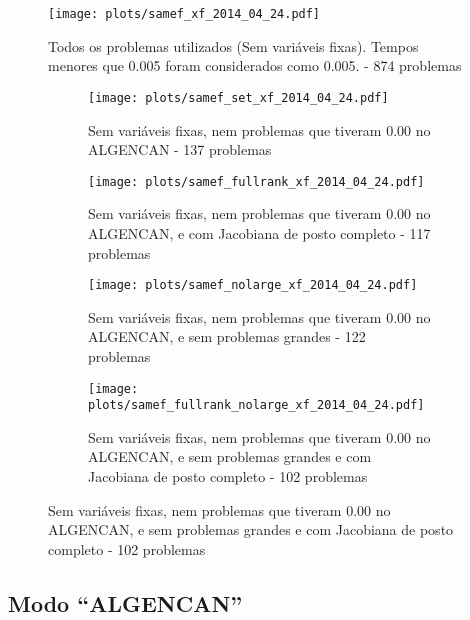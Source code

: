 \documentclass{article}
\begin{document}
\begin{figure}[H]
  \centering
  \texttt{[image: plots/samef\_xf\_2014\_04\_24.pdf]}
  \caption{Todos os problemas utilizados (Sem variáveis fixas). Tempos menores
    que 0.005 foram considerados como 0.005. - 874 problemas}
\end{figure}
\begin{figure}[H]
  \centering
  \begin{subfigure}{0.48\textwidth}
    \texttt{[image: plots/samef\_set\_xf\_2014\_04\_24.pdf]}
    \caption{Sem variáveis fixas, nem problemas
      que tiveram 0.00 no ALGENCAN - 137 problemas}
  \end{subfigure}
  \begin{subfigure}{0.48\textwidth}
    \texttt{[image: plots/samef\_fullrank\_xf\_2014\_04\_24.pdf]}
    \caption{Sem variáveis fixas, nem problemas
      que tiveram 0.00 no ALGENCAN, e com Jacobiana de posto completo - 117
      problemas}
  \end{subfigure}
  \begin{subfigure}{0.48\textwidth}
    \texttt{[image: plots/samef\_nolarge\_xf\_2014\_04\_24.pdf]}
    \caption{Sem variáveis fixas, nem problemas
      que tiveram 0.00 no ALGENCAN, e sem problemas grandes - 122 problemas}
  \end{subfigure}
  \begin{subfigure}{0.48\textwidth}
    \texttt{[image: plots/samef\_fullrank\_nolarge\_xf\_2014\_04\_24.pdf]}
    \caption{Sem variáveis fixas, nem problemas
      que tiveram 0.00 no ALGENCAN, e sem problemas grandes e com Jacobiana de
      posto completo - 102 problemas}
  \end{subfigure}
\end{figure}

\subsection{Modo ``ALGENCAN''}
\end{document}

